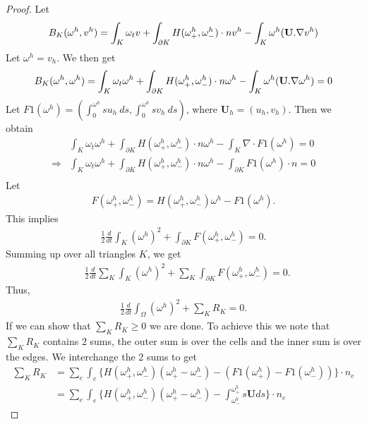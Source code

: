 \documentclass[11pt]{article}
\begin{document}
\begin{proof}
 Let 
 $$
 B_K(\omega^h, v^h) = \int_K\omega_t{v}+\int_{\partial{K}}H(\omega_+^h,\omega_-^h)\cdot{n}v^h-\int_K\omega^h({{\bf{U}}}.\nabla{v^h})
 $$
 Let $\omega^h=v_h$. We then get
 $$
  B_K(\omega^h, \omega^h) = \int_K\omega_t{\omega^h}+\int_{\partial{K}}H(\omega_+^h,\omega_-^h)\cdot{n}\omega^h-\int_K\omega^h({{\bf{U}}}.\nabla{\omega^h})=0
 $$
 Let $F1(\omega^h) = (\int_0^{\omega^h}s{u_h}~ds,\int_0^{\omega^h}s{v_h}~ds)$, where $\textbf{U}_h=(u_h,v_h)$.
 Then we obtain
 \begin{equation}
  \begin{aligned}
    &\int_K\omega_t{\omega^h}+\int_{\partial{K}}H(\omega_+^h,\omega_-^h)\cdot{n}\omega^h-\int_K\nabla\cdot{F1(\omega^h)}=0\\
    \Rightarrow &\int_K\omega_t{\omega^h}+\int_{\partial{K}}H(\omega_+^h,\omega_-^h)\cdot{n}\omega^h-\int_{\partial{K}}F1(\omega^h)\cdot{n}=0\\
  \end{aligned}
 \end{equation}
Let
\begin{equation*}
 \begin{aligned}
 F(\omega_+^h,\omega_-^h) = H(\omega_+^h,\omega_-^h)\omega^h-F1(\omega^h).
\end{aligned}
\end{equation*}
This implies
\begin{equation*}
 \begin{aligned}
 \frac{1}{2}\frac{d}{dt}\int_K(\omega^h)^2 +\int_{\partial{K}}F(\omega_+^h,\omega_-^h)=0.
\end{aligned}
\end{equation*}
Summing up over all triangles $K$, we get
\begin{equation*}
 \begin{aligned}
 &\frac{1}{2}\frac{d}{dt}\sum_K\int_K(\omega^h)^2 + \sum_K\int_{\partial{K}}F(\omega_+^h,\omega_-^h)=0.
\end{aligned}
\end{equation*}
Thus,
\begin{equation}\label{en}
 \begin{aligned}
\frac{1}{2}\frac{d}{dt}\int_\Omega(\omega^h)^2 +\sum_K R_K =0.
 \end{aligned}
\end{equation}
If we can show that $\sum_K R_K \geq 0$ we are done. To achieve this we note that  $\sum_K R_K$ contains
2 sums, the outer sum is over the cells and the inner sum is over the edges. We interchange the 2 sums to get
\begin{equation}
 \begin{aligned}
  \sum_K R_K &= \sum_e \int_e \lbrace H(\omega_+^h,\omega_-^h)(\omega^h_+-\omega^h_-) - (F1(\omega^h_+)-F1(\omega^h_-))\rbrace\cdot n_e\\
  &=\sum_e \int_e \lbrace H(\omega_+^h,\omega_-^h)(\omega^h_+-\omega^h_-) - \int_{\omega^h_-}^{\omega^h_+}s\textbf{U}ds\rbrace\cdot n_e
 \end{aligned}
\end{equation}


\end{proof}
\end{document}
